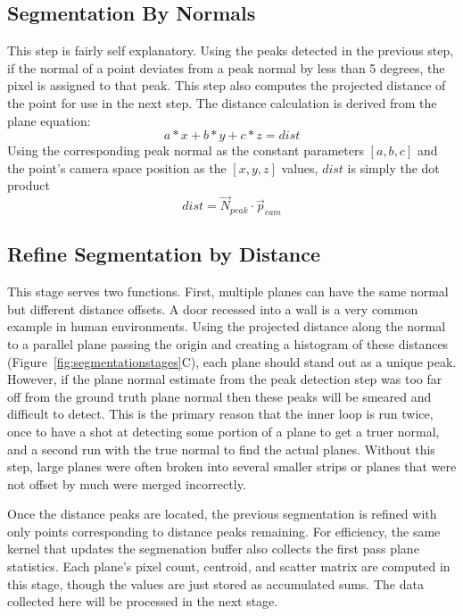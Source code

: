 \subsection{Segmentation By Normals}
This step is fairly self explanatory. Using the peaks detected in the previous step, if the normal of a point deviates from a peak normal by less than 5 degrees, the pixel is assigned to that peak. This step also computes the projected distance of the point for use in the next step. The distance calculation is derived from the plane equation: $$a*x+b*y+c*z=dist$$
Using the corresponding peak normal as the constant parameters $[a,b,c]$ and the point's camera space position as the $[x,y,z]$ values, $dist$ is simply the dot product $$dist=\vec{N}_{peak} \cdot \vec{p}_{cam}$$

\subsection{Refine Segmentation by Distance}
This stage serves two functions. First, multiple planes can have the same normal but different distance offsets. A door recessed into a wall is a very common example in human environments. Using the projected distance along the normal to a parallel plane passing the origin and creating a histogram of these distances (Figure~\ref{fig:segmentationstages}C), each plane should stand out as a unique peak. However, if the plane normal estimate from the peak detection step was too far off from the ground truth plane normal then these peaks will be smeared and difficult to detect. This is the primary reason that the inner loop is run twice, once to have a shot at detecting some portion of a plane to get a truer normal, and a second run with the true normal to find the actual planes. Without this step, large planes were often broken into several smaller strips or planes that were not offset by much were merged incorrectly.\par 
Once the distance peaks are located, the previous segmentation is refined with only points corresponding to distance peaks remaining. For efficiency, the same kernel that updates the segmenation buffer also collects the first pass plane statistics. Each plane's pixel count, centroid, and scatter matrix are computed in this stage, though the values are just stored as accumulated sums. The data collected here will be processed in the next stage.
